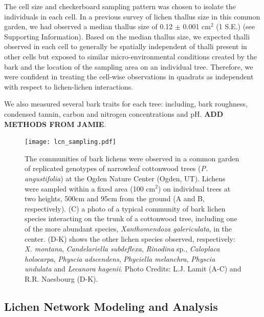\documentclass[11pt,twocolumn,twoside,lineno]{pnas-new}
\begin{document}
{The cell size and checkerboard sampling pattern was chosen to isolate
the individuals in each cell. In a previous survey of lichen thallus
size in this common garden, we had observed a median thallus size of
0.12 $\pm$ 0.001 cm$^2$ (1 S.E.) (see Supporting Information). Based
on the median thallus size, we expected thalli observed in each cell
to generally be spatially independent of thalli present in other cells
but exposed to similar micro-environmental conditions created by the
bark and the location of the sampling area on an individual
tree. Therefore, we were confident in treating the cell-wise
observations in quadrats as independent with respect to lichen-lichen
interactions.



We also measured several bark traits for each tree: including, bark
roughness, condensed tannin, carbon and nitrogen concentrations and
pH. \textbf{ADD METHODS FROM JAMIE}.



\begin{figure}[ht]
\centering
\texttt{[image: lcn\_sampling.pdf]}
\caption{The communities of bark lichens were observed in a common
  garden of replicated genotypes of narrowleaf cottonwood trees
  (\textit{P. angustifolia}) at the Ogden Nature Center (Ogden,
  UT). Lichens were sampled within a fixed area (100 cm$^2$) on
  individual trees at two heights, 500cm and 95cm from the ground (A
  and B, respectively). (C) a photo of a typical community of bark
  lichen species interacting on the trunk of a cottonwood tree,
  including one of the more abundant species, \textit{Xanthomendoza
    galericulata}, in the center. (D-K) shows the other lichen species
  observed, respectively:  \textit{X. montana}, \textit{Candelariella
    subdeflexa}, \textit{Rinodina} sp., \textit{Caloplaca holocarpa},
  \textit{Physcia adscendens}, \textit{Phyciella melanchra},
  \textit{Physcia undulata} and \textit{Lecanora hagenii}. Photo
  Credits: L.J. Lamit (A-C) and R.R. Naesbourg (D-K).}
\label{fig:lichen_sampling}
\end{figure}


\subsection*{Lichen Network Modeling and Analysis}

}
\end{document}
